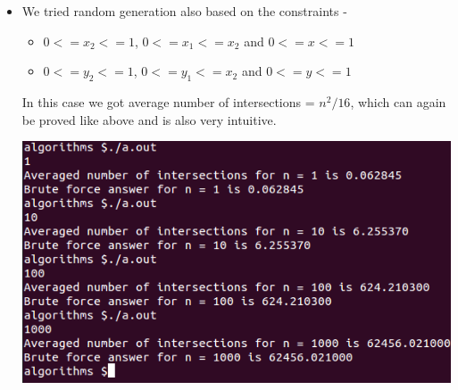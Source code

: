 \documentclass{article}
\begin{document}
\begin{itemize}
\subsubsection{Bonus Question Proof}
From our uniform generation we have that ($0<=x_1<=1$), ($0<=x_2<=1$), ($0<=y_1<=1$), ($0<=y_2<=1$), ($0<=x<=1$) and ($0<=y<=1$) are random variables with probability distribution function as $1$ in $[0,1]$ and 0 otherwise. Therefore, the probability of $x$ lying between $[x_1,x_2]$ will be (taking $x_1<=x_2$) -
\begin{center}
$\int_{0}^{1} {$\int_{x_1}^{1} {$\int_{x}^{1} 1 * dx_2 $} * dx * $} dx_1$
= 1/6
\end{center}
Similarly for $x_1>=x_2$ it will be $1/6$. Implying overall probability of $x$ lying between $x_1$ and $x_2$ is $1/3$. \\*
Blue and Red line segments will intersect when 
\begin{center}
$x$ lies between $x_1$ and $x_2$ \\*
and \\*
$y$ lies between $y_1$ and $y_2$ \\*
\end{center}
Implies probability of one blue and one red line segment intersection is -
\begin{center}
= $1/3 * 1/3 = 1/9$ \\*
As $x$ and $y$ are independent random variables here.
\end{center}
There are $n^2$ pairs of $(red,blue)$ line segments. Implying on an average when $test\_cases$ is pretty large, the number of intersections should be
\begin{center}
 = $n^2 * 1/9$ \\*
 = $n^2/9$
\end{center} 
\item  We tried random generation also based on the constraints - 
\begin{itemize}
\item $0<=x_2<=1$, $0<=x_1<=x_2$ and $0<=x<=1$
\item $0<=y_2<=1$, $0<=y_1<=x_2$ and $0<=y<=1$
\end{itemize}
In this case we got average number of intersections = $n^2/16$, which can again be proved like above and is also very intuitive.
\begin{center}
\includegraphics[scale=0.5]{out.png}

\end{center}
\end{itemize}
\end{document}
